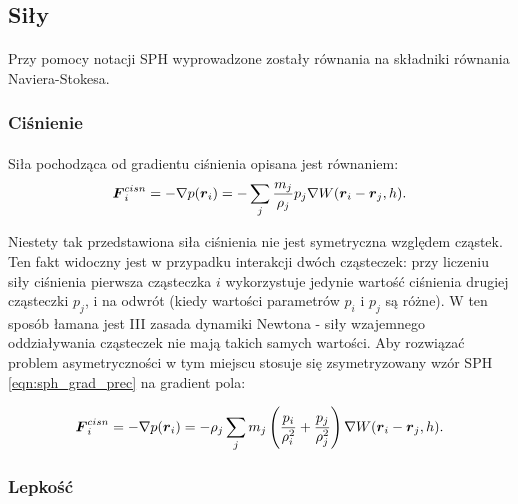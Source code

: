 \subsection{Siły}
\label{subsec:forces_ss}

\paragraph{}
Przy pomocy notacji SPH wyprowadzone zostały równania na składniki równania Naviera-Stokesa.
\par

\subsubsection{Ciśnienie}

\paragraph{}
Siła pochodząca od gradientu ciśnienia opisana jest równaniem:
\begin{equation}
\boldsymbol{F}_i^{cisn} = -\nabla p(\boldsymbol{r}_i) = - \sum\limits_{j} {m_j \over \rho_j} p_j \nabla W(\boldsymbol{r}_i-\boldsymbol{r}_j, h).
\label{eqn:sph_force_pressure_1}
\end{equation}

Niestety tak przedstawiona siła ciśnienia nie jest symetryczna względem cząstek. Ten fakt widoczny jest w przypadku interakcji dwóch cząsteczek: przy liczeniu siły ciśnienia pierwsza cząsteczka $i$ wykorzystuje jedynie wartość ciśnienia drugiej cząsteczki $p_j$, i na odwrót (kiedy wartości parametrów $p_i$ i $p_j$ są różne). W ten sposób łamana jest III zasada dynamiki Newtona - siły wzajemnego oddziaływania cząsteczek nie mają takich samych wartości. Aby rozwiązać problem asymetryczności w tym miejscu stosuje się zsymetryzowany wzór SPH \eqref{eqn:sph_grad_prec} na gradient pola:

\begin{equation}
\boldsymbol{F}_i^{cisn} = -\nabla p(\boldsymbol{r}_i) = - \rho_j \sum\limits_{j} m_j \left( {p_i \over \rho_i^2} + {p_j \over \rho_j^2} \right) \nabla W(\boldsymbol{r}_i-\boldsymbol{r}_j, h).
\label{eqn:sph_force_pressure}
\end{equation}

\par

\subsubsection{Lepkość}

